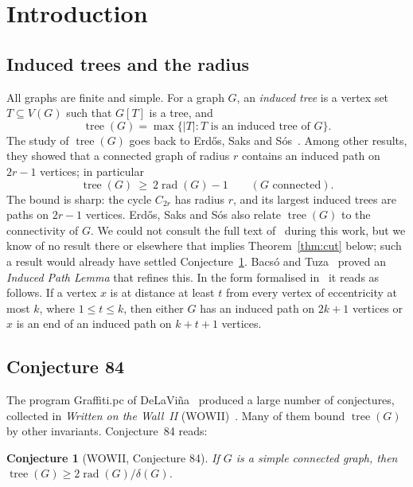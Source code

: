 \documentclass[11pt,a4paper]{article}
\newtheorem{conjecture}[theorem]{Conjecture}
\theoremstyle{definition}
\newcommand{\rad}{\operatorname{rad}}
\newcommand{\tr}{\operatorname{tree}}
\begin{document}
\tableofcontents

\section{Introduction}

\subsection{Induced trees and the radius}

All graphs are finite and simple. For a graph $G$, an \emph{induced tree} is a vertex set $T\subseteq V(G)$ such that $G[T]$ is a tree, and
\[
\tr(G)=\max\{|T| : T \text{ is an induced tree of } G\}.
\]
The study of $\tr(G)$ goes back to Erd\H{o}s, Saks and S\'os~\cite{ESS86}. Among other results, they showed that a connected graph of radius $r$ contains an induced path on $2r-1$ vertices; in particular
\begin{equation}\label{eq:ESS}
\tr(G)\ \ge\ 2\rad(G)-1 \qquad (G \text{ connected}).
\end{equation}
The bound is sharp: the cycle $C_{2r}$ has radius $r$, and its largest induced trees are paths on $2r-1$ vertices. Erd\H{o}s, Saks and S\'os also relate $\tr(G)$ to the connectivity of $G$. We could not consult the full text of~\cite{ESS86} during this work, but we know of no result there or elsewhere that implies Theorem~\ref{thm:cut} below; such a result would already have settled Conjecture~\ref{conj:84}. Bacs\'o and Tuza~\cite{BT90} proved an \emph{Induced Path Lemma} that refines this. In the form formalised in~\cite{Mak} it reads as follows. If a vertex $x$ is at distance at least $t$ from every vertex of eccentricity at most $k$, where $1\le t\le k$, then either $G$ has an induced path on $2k+1$ vertices or $x$ is an end of an induced path on $k+t+1$ vertices.

\subsection{Conjecture 84}

The program Graffiti.pc of DeLaVi\~na~\cite{DeL05} produced a large number of conjectures, collected in \emph{Written on the Wall~II} (WOWII)~\cite{WOWII}. Many of them bound $\tr(G)$ by other invariants. Conjecture~84 reads:

\begin{conjecture}[WOWII, Conjecture 84]\label{conj:84}
If $G$ is a simple connected graph, then $\tr(G)\ge 2\rad(G)/\delta(G)$.
\end{conjecture}
\end{document}
